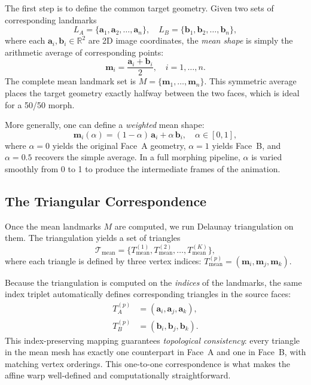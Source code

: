 The first step is to define the common target geometry. Given two sets of corresponding landmarks
\[
    L_A = \{\mathbf{a}_1, \mathbf{a}_2, \ldots, \mathbf{a}_n\}, \quad
    L_B = \{\mathbf{b}_1, \mathbf{b}_2, \ldots, \mathbf{b}_n\},
\]
where each $\mathbf{a}_i, \mathbf{b}_i \in \mathbb{R}^2$ are 2D image coordinates, the \emph{mean shape} is simply the arithmetic average of corresponding points:
\begin{equation}
    \mathbf{m}_i = \frac{\mathbf{a}_i + \mathbf{b}_i}{2}, \quad i = 1, \ldots, n.
\end{equation}
The complete mean landmark set is $M = \{\mathbf{m}_1, \ldots, \mathbf{m}_n\}$. This symmetric average places the target geometry exactly halfway between the two faces, which is ideal for a 50/50 morph.

More generally, one can define a \emph{weighted} mean shape:
\begin{equation}
    \mathbf{m}_i(\alpha) = (1 - \alpha)\,\mathbf{a}_i + \alpha\,\mathbf{b}_i, \quad \alpha \in [0, 1],
\end{equation}
where $\alpha = 0$ yields the original Face~A geometry, $\alpha = 1$ yields Face~B, and $\alpha = 0.5$ recovers the simple average. In a full morphing pipeline, $\alpha$ is varied smoothly from 0 to 1 to produce the intermediate frames of the animation.

\subsection{The Triangular Correspondence}

Once the mean landmarks $M$ are computed, we run Delaunay triangulation on them. The triangulation yields a set of triangles
\[
    \mathcal{T}_{\text{mean}} = \{ T_{\text{mean}}^{(1)}, T_{\text{mean}}^{(2)}, \ldots, T_{\text{mean}}^{(K)} \},
\]
where each triangle is defined by three vertex indices: $T_{\text{mean}}^{(p)} = (\mathbf{m}_i, \mathbf{m}_j, \mathbf{m}_k)$.

Because the triangulation is computed on the \emph{indices} of the landmarks, the same index triplet automatically defines corresponding triangles in the source faces:
\begin{align*}
    T_A^{(p)} &= (\mathbf{a}_i, \mathbf{a}_j, \mathbf{a}_k), \\
    T_B^{(p)} &= (\mathbf{b}_i, \mathbf{b}_j, \mathbf{b}_k).
\end{align*}
This index-preserving mapping guarantees \emph{topological consistency}: every triangle in the mean mesh has exactly one counterpart in Face~A and one in Face~B, with matching vertex orderings. This one-to-one correspondence is what makes the affine warp well-defined and computationally straightforward.

